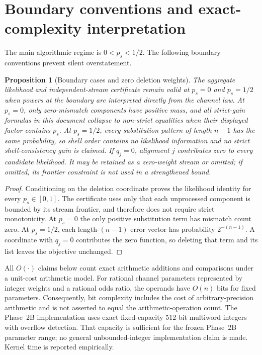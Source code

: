 \documentclass[11pt]{article}
\newtheorem{proposition}[theorem]{Proposition}
\theoremstyle{remark}
\begin{document}
\section{Boundary conventions and exact-complexity interpretation}

The main algorithmic regime is $0<p_s<1/2$.  The following boundary conventions prevent
silent overstatement.

\begin{proposition}[Boundary cases and zero deletion weights]
The aggregate likelihood and independent-stream certificate remain valid at $p_s=0$ and
$p_s=1/2$ when powers at the boundary are interpreted directly from the channel law.
At $p_s=0$, only zero-mismatch components have positive mass, and all strict-gain formulas
in this document collapse to non-strict equalities when their displayed factor contains
$p_s$.  At $p_s=1/2$, every substitution pattern of length $n-1$ has the same probability,
so shell order contains no likelihood information and no strict shell-consistency gain is
claimed.  If $q_j=0$, alignment $j$ contributes zero to every candidate likelihood.  It may
be retained as a zero-weight stream or omitted; if omitted, its frontier constraint is not
used in a strengthened bound.
\end{proposition}

\begin{proof}
Conditioning on the deletion coordinate proves the likelihood identity for every
$p_s\in[0,1]$.  The certificate uses only that each unprocessed component is bounded by its
stream frontier, and therefore does not require strict monotonicity.  At $p_s=0$ the only
positive substitution term has mismatch count zero.  At $p_s=1/2$, each length-$(n-1)$
error vector has probability $2^{-(n-1)}$.  A coordinate with $q_j=0$ contributes the zero
function, so deleting that term and its list leaves the objective unchanged.
\end{proof}

All $O(\cdot)$ claims below count exact arithmetic additions and comparisons under a
unit-cost arithmetic model.  For rational channel parameters represented by integer
weights and a rational odds ratio, the operands have $O(n)$ bits for fixed parameters.
Consequently, bit complexity includes the cost of arbitrary-precision arithmetic and is
not asserted to equal the arithmetic-operation count.  The Phase~2B implementation uses exact fixed-capacity 512-bit multiword integers
with overflow detection.  That capacity is sufficient for the frozen Phase~2B parameter
range; no general unbounded-integer implementation claim is made.  Kernel time is
reported empirically.
\end{document}
